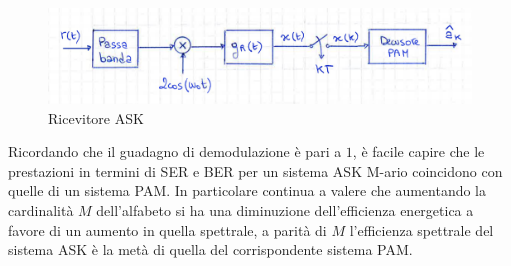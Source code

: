         \begin{figure}[H]
            \centering
            \includegraphics[width = 12cm]{media/ricevitore ask.png}
            \caption{Ricevitore ASK}
        \end{figure}
        Ricordando che il guadagno di demodulazione è pari a $1$, è facile capire che le prestazioni in termini di SER e BER per un sistema ASK
        M-ario coincidono con quelle di un sistema PAM. In particolare continua a valere che aumentando la cardinalità $M$ dell'alfabeto 
        si ha una diminuzione dell'efficienza energetica a favore di un aumento in quella spettrale, a parità di $M$ l'efficienza 
        spettrale del sistema ASK è la metà di quella del corrispondente sistema PAM. 
